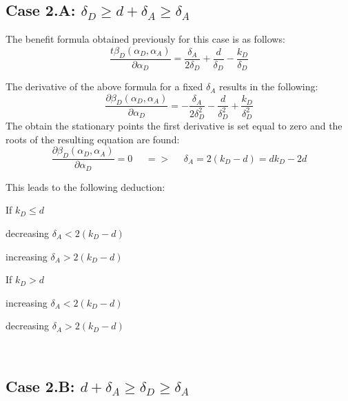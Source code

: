 \subsection*{Case 2.A: $\delta_{D} \geq d+\delta_{A} \geq \delta_{A} $ }

The benefit formula obtained previously for this case is as follows:
\begin{equation*}
\dfrac{t \beta_{D}(\alpha_{D},\alpha_{A})}{\partial \alpha_{D}} = \dfrac{\delta_{A}}{2\delta_{D}} + \dfrac{d}{\delta_{D}} - \dfrac{k_{D}}{\delta_{D}}
\end{equation*}

The derivative of the above formula for a fixed $\delta_{A}$ results in the following:
\begin{equation*}
\frac{\partial \beta_{D}(\alpha_{D},\alpha_{A})}{\partial \alpha_{D}} = -\dfrac{\delta_{A}}{2\delta_{D}^{2}} - \dfrac{d}{\delta_{D}^{2}} + \dfrac{k_{D}}{\delta_{D}^{2}}
\end{equation*}
The obtain the stationary points the first derivative is set equal to zero and the roots of the resulting equation are found:
\begin{equation*}
\frac{\partial \beta_{D}(\alpha_{D},\alpha_{A})}{\partial \alpha_{D}} =0 ~~~~~~ =>~~~~~~ \delta_{A} = 2(k_{D}-d) = dk_{D} - 2d
\end{equation*}

This leads to the following deduction:
\begin{description}
\item If $k_{D} \leq d$ 
\begin{description}
\item decreasing $ \delta_{A} < 2(k_{D} -d)$
\item increasing  $\delta_{A} > 2(k_{D} -d)$ 
\end{description}
\item If $k_{D} > d$ 
\begin{description}
\item increasing $ \delta_{A} < 2(k_{D} -d)$
\item decreasing  $\delta_{A} > 2(k_{D} -d)$ 
\end{description}
\end{description}
~~\\

\subsection*{Case 2.B: $d+\delta_{A} \geq \delta_{D} \geq  \delta_{A} $} 

